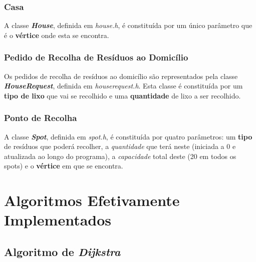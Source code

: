 \documentclass[article, a4paper, 12pt, oneside]{memoir}
\begin{document}
\subsection{Casa}

A classe \textbf{\textit{House}}, definida em \textit{house.h}, é constituída por um único parâmetro que é o \textbf{vértice} onde esta se encontra.

\subsection{Pedido de Recolha de Resíduos ao Domicílio}

Os pedidos de recolha de resíduos ao domicílio são representados pela classe \textbf{\textit{HouseRequest}}, definida em \textit{houserequest.h}. Esta classe é constituída por um \textbf{tipo de lixo} que vai se recolhido e uma \textbf{quantidade} de lixo a ser recolhido.

\subsection{Ponto de Recolha}

A classe \textbf{\textit{Spot}}, definida em \textit{spot.h}, é constituída por quatro parâmetros: um \textbf{tipo} de resíduos que poderá recolher, a \textit{quantidade} que terá neste (iniciada a 0 e atualizada ao longo do programa), a \textit{capacidade} total deste (20 em todos os spots) e o \textbf{vértice} em que se encontra.

\newpage
\chapter[Algoritmos Efetivamente Implementados][Algoritmos Efetivamente Implementados]{Algoritmos Efetivamente Implementados} \label{\thechapter}

\section{Algoritmo de \textit{Dijkstra}}
\end{document}
